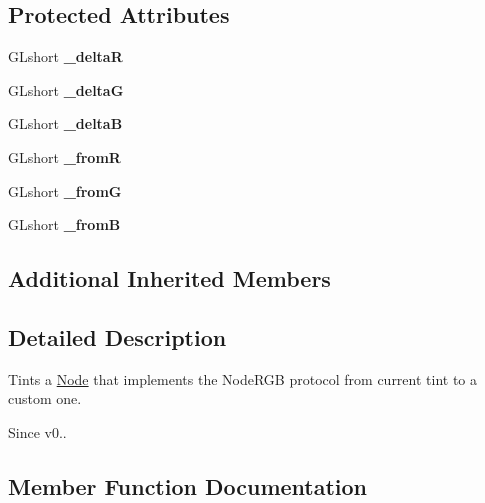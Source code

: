 \subsection*{Protected Attributes}
\begin{DoxyCompactItemize}
\item 
\mbox{\label{classTintBy_a3f6890f6de46506d753b3b2cde8d8060}} 
G\+Lshort {\bfseries \+\_\+deltaR}
\item 
\mbox{\label{classTintBy_adc1895201db3068040171b1bd5b81bf5}} 
G\+Lshort {\bfseries \+\_\+deltaG}
\item 
\mbox{\label{classTintBy_ab86b108fe539daef5de50d8de0e1bd12}} 
G\+Lshort {\bfseries \+\_\+deltaB}
\item 
\mbox{\label{classTintBy_aa50823c8ecccbdbe85a869b3716939ff}} 
G\+Lshort {\bfseries \+\_\+fromR}
\item 
\mbox{\label{classTintBy_a5f6f0512eb839f6366c1a5f1dac2068b}} 
G\+Lshort {\bfseries \+\_\+fromG}
\item 
\mbox{\label{classTintBy_a891ebbcc3953da0d8b6588a8447cd253}} 
G\+Lshort {\bfseries \+\_\+fromB}
\end{DoxyCompactItemize}
\subsection*{Additional Inherited Members}


\subsection{Detailed Description}
Tints a \hyperlink{classNode}{Node} that implements the Node\+R\+GB protocol from current tint to a custom one. 

\begin{DoxySince}{Since}
v0.. 
\end{DoxySince}


\subsection{Member Function Documentation}
\mbox{\label{classTintBy_a01fb266a5a274c34fae1678860b31034}} 
